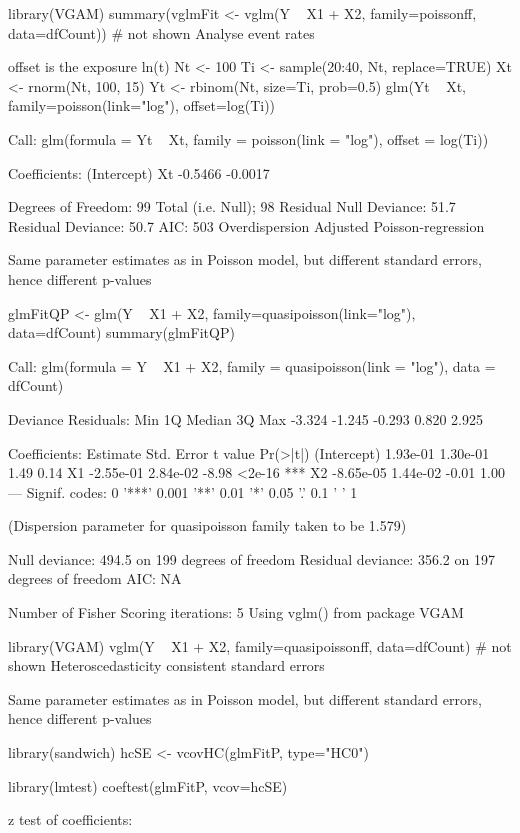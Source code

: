 library(VGAM)
summary(vglmFit <- vglm(Y ~ X1 + X2, family=poissonff, data=dfCount))
# not shown
Analyse event rates

offset is the exposure ln(t)
Nt   <- 100
Ti   <- sample(20:40, Nt, replace=TRUE)
Xt   <- rnorm(Nt, 100, 15)
Yt   <- rbinom(Nt, size=Ti, prob=0.5)
glm(Yt ~ Xt, family=poisson(link="log"), offset=log(Ti))

Call:  glm(formula = Yt ~ Xt, family = poisson(link = "log"), offset = log(Ti))

Coefficients:
(Intercept)           Xt  
    -0.5466      -0.0017  

Degrees of Freedom: 99 Total (i.e. Null);  98 Residual
Null Deviance:      51.7 
Residual Deviance: 50.7     AIC: 503 
Overdispersion
Adjusted Poisson-regression

Same parameter estimates as in Poisson model, but different standard errors, hence different p-values

glmFitQP <- glm(Y ~ X1 + X2, family=quasipoisson(link="log"), data=dfCount)
summary(glmFitQP)

Call:
glm(formula = Y ~ X1 + X2, family = quasipoisson(link = "log"), 
    data = dfCount)

Deviance Residuals: 
   Min      1Q  Median      3Q     Max  
-3.324  -1.245  -0.293   0.820   2.925  

Coefficients:
             Estimate Std. Error t value Pr(>|t|)    
(Intercept)  1.93e-01   1.30e-01    1.49     0.14    
X1          -2.55e-01   2.84e-02   -8.98   <2e-16 ***
X2          -8.65e-05   1.44e-02   -0.01     1.00    
---
Signif. codes:  0 '***' 0.001 '**' 0.01 '*' 0.05 '.' 0.1 ' ' 1 

(Dispersion parameter for quasipoisson family taken to be 1.579)

    Null deviance: 494.5  on 199  degrees of freedom
Residual deviance: 356.2  on 197  degrees of freedom
AIC: NA

Number of Fisher Scoring iterations: 5
Using vglm() from package VGAM

library(VGAM)
vglm(Y ~ X1 + X2, family=quasipoissonff, data=dfCount)
# not shown
Heteroscedasticity consistent standard errors

Same parameter estimates as in Poisson model, but different standard errors, hence different p-values

library(sandwich)
hcSE <- vcovHC(glmFitP, type="HC0")

library(lmtest)
coeftest(glmFitP, vcov=hcSE)

z test of coefficients:

